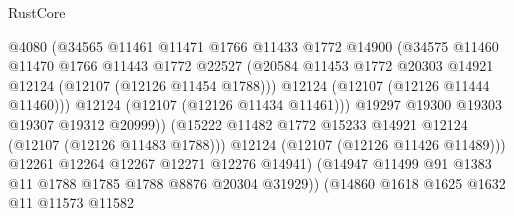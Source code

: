 \begin{lexlean}{RustCore}
\begin{coremodule}
                                      @4080
                                      (@34565
                                        @11461
                                        @11471
                                        @1766
                                        @11433
                                        @1772
                                        @14900
                                        (@34575
                                          @11460
                                          @11470
                                          @1766
                                          @11443
                                          @1772
                                          @22527
                                          (@20584
                                            @11453
                                            @1772
                                            @20303
                                            @14921
                                            @12124
                                            (@12107 (@12126 @11454 @1788)))
                                          @12124
                                          (@12107 (@12126 @11444 @11460)))
                                        @12124
                                        (@12107 (@12126 @11434 @11461)))
                                      @19297
                                      @19300
                                      @19303
                                      @19307
                                      @19312
                                      @20999))
                                  (@15222
                                    @11482
                                    @1772
                                    @15233
                                    @14921
                                    @12124
                                    (@12107 (@12126 @11483 @1788)))
                                  @12124
                                  (@12107 (@12126 @11426 @11489)))
                                @12261
                                @12264
                                @12267
                                @12271
                                @12276
                                @14941)
                              (@14947 @11499 @91 @1383 @11 @1788 @1785 @1788 @8876 @20304 @31929))
                            (@14860
                              @1618
                              @1625
                              @1632
                              @11
                              @11573
                              @11582

\end{coremodule}
\end{lexlean}
